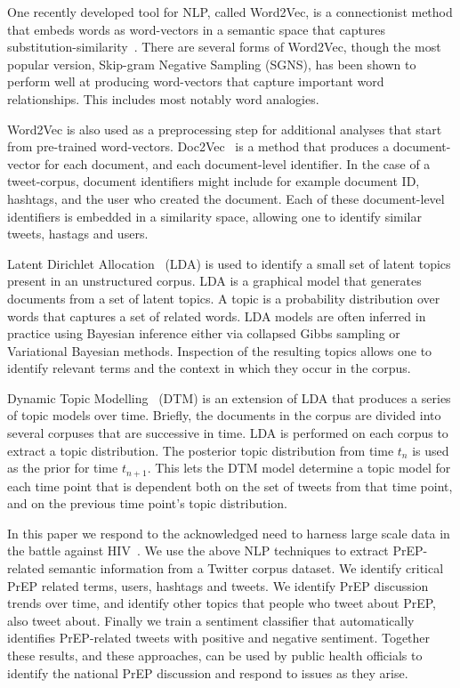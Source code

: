 \documentclass{sig-alternate-05-2015}
\begin{document}
One recently developed tool for NLP, called Word2Vec, is a connectionist method that embeds words as word-vectors in a semantic space that captures substitution-similarity~\cite{mikolov2013efficient}. There are several forms of Word2Vec, though the most popular version, Skip-gram Negative Sampling (SGNS), has been shown to perform well at producing word-vectors that capture important word relationships. This includes most notably word analogies. 

Word2Vec is also used as a preprocessing step for additional analyses that start from pre-trained word-vectors. Doc2Vec~\cite{le2014distributed} is a method that produces a document-vector for each document, and each document-level identifier. In the case of a tweet-corpus, document identifiers might include for example document ID, hashtags, and the user who created the document. Each of these document-level identifiers is embedded in a similarity space, allowing one to identify similar tweets, hastags and users.

Latent Dirichlet Allocation~\cite{blei2003latent} (LDA) is used to identify a small set of latent topics present in an unstructured corpus. LDA is a graphical model that generates documents from a set of latent topics. A topic is a probability distribution over words that captures a set of related words. LDA models are often inferred in practice using Bayesian inference either via collapsed Gibbs sampling or Variational Bayesian methods. Inspection of the resulting topics allows one to identify relevant terms and the context in which they occur in the corpus. 

Dynamic Topic Modelling~\cite{blei2006dynamic} (DTM) is an extension of LDA that produces a series of topic models over time. Briefly, the documents in the corpus are divided into several corpuses that are successive in time. LDA is performed on each corpus to extract a topic distribution. The posterior topic distribution from time $t_n$ is used as the prior for time $t_{n+1}$. This lets the DTM model determine a topic model for each time point that is dependent both on the set of tweets from that time point, and on the previous time point's topic distribution.

In this paper we respond to the acknowledged need to harness large scale data in the battle against HIV~\cite{young2015big}. We use the above NLP techniques to extract PrEP-related semantic information from a Twitter corpus dataset. We identify critical PrEP related terms, users, hashtags and tweets. We identify PrEP discussion trends over time, and identify other topics that people who tweet about PrEP, also tweet about. Finally we train a sentiment classifier that automatically identifies PrEP-related tweets with positive and negative sentiment. Together these results, and these approaches, can be used by public health officials to identify the national PrEP discussion and respond to issues as they arise.
\end{document}
